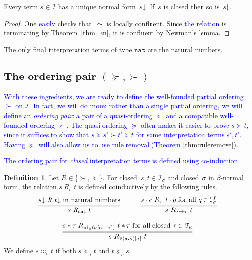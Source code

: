 \documentclass[a4paper,UKenglish,cleveref,autoref,numberwithinsect]{lipics-v2019}
\theoremstyle{definition}
\newtheorem{defn}[theorem]{Definition}
\newcommand{\Iterms}{\mathcal{I}}
\newcommand{\arrtype}{\rightarrow}
\newcommand{\app}[2]{#1 \cdot #2}
\newcommand{\tapp}[2]{#1 * #2}
\newcommand{\subst}[2]{#1:=#2}
\newcommand{\arrW}{\leadsto}
\newcommand{\nat}{\mathtt{nat}}
\newcommand{\Tc}{\mathcal{T}}
\newcommand{\nf}{\mathrm{nf}}
\newcommand{\da}{\mathord{\downarrow}}
\newcommand{\CKchange}[1]{\textcolor{blue}{#1}}
\begin{document}
\begin{lemma}\label{lem_unique_final}
  Every term $s \in \Iterms$ has a unique normal form~$s\da$. If~$s$
  is closed then so is~$s\da$.
\end{lemma}

\begin{proof}
  One \CKchange{easily}
  checks that~$\arrW$ is locally confluent. Since \CKchange{the
  relation} is
  terminating by Theorem~\ref{thm_sn}, it is confluent by Newman's
  lemma.
\end{proof}

\begin{lemma}\label{lem_final_nat}
  The only final interpretation terms of type $\nat$ are the natural
  numbers.
\end{lemma}

\subsection{The ordering pair $(\succeq,\succ)$}\label{subsec:succ}

\CKchange{With these ingredients, we are ready to define the well-founded
partial ordering $\succ$ on $\Iterms$.  In fact, we will do more: rather
than a single partial ordering, we will define an \emph{ordering pair}: a
pair of a quasi-ordering $\succeq$ and a compatible well-founded ordering
$\succ$. The quasi-ordering $\succeq$ often makes it easier to prove
$s \succ t$, since it suffices to show that $s \succeq s' \succ t'
\succeq t$ for some interpretation terms $s',t'$.  Having $\succeq$ will
also allow us to use rule removal (Theorem \ref{thm:ruleremove}).}

\CKchange{The ordering pair for \emph{closed} interpretation terms is
defined using co-induction.}

\begin{defn}\label{def:succ}
  Let $R \in \{ \succ,\succeq \}$. For closed~$s,t\in\Iterms_\sigma$
  and closed~$\sigma$ in $\beta$-normal form, the relation
  $s\ R_{\sigma}\ t$ is defined coinductively by the following rules.
  \[
  \begin{array}{cc}
    \infer={s\ R_\nat\ t}{s\da\ R\ t\da \text{ in natural numbers}} \quad&\quad
    \infer={s\ R_{\sigma\arrtype\tau}\ t}{\app{s}{q}\ R_{\tau}\ \app{t}{q} \text{ for all } q \in \Iterms^f_\sigma} \\ \\
    \multicolumn{2}{c}{
    \infer={s\ R_{\forall(\alpha:\kappa)[\sigma]}\ t}{\tapp{s}{\tau}\ R_{\nf_\beta(\sigma[\subst{\alpha}{\tau}])}\ \tapp{t}{\tau} \text{ for all closed } \tau \in \Tc_{\kappa}}}
  \end{array}
  \]
  We define $s \approx_\sigma t$ if both $s \succeq_\sigma t$ and $t
  \succeq_\sigma s$.
\end{defn}
\end{document}
